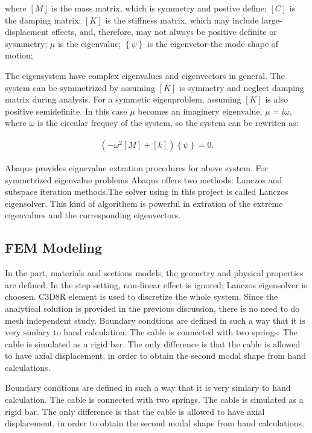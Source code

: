 \documentclass[paper=a4, fontsize=11pt]{scrartcl} %
\numberwithin{equation}{section} %
\numberwithin{figure}{section} %
\numberwithin{table}{section} %
\begin{document}
where $[M]$ is the mass matrix, which is symmetry and postive define;
$[C]$ is the damping matrix; $[K]$ is the stiffness matrix, which may
include large-displacment effects, and, therefore, may not always be
positive definite or sysmmetry; $\mu$ is the eigenvalue;
$\left\{\psi\right\}$ is the eigenvetor-the mode shape of motion;

The eigensystem have complex eigenvalues and eigenvectors in general.
The system can be symmetrized by assuming $[K]$ is symmetry and neglect
damping matrix during analysis. For a symmetic eigenproblem, assuming
$[K]$ is also positive semidefinite. In this case $\mu$ becomes an
imaginery eigenvalue, $\mu=i\omega$, where $\omega$ is the circular
frequey of the system, so the system can be rewriten as:

\begin{align}
\left(-\omega^2\left[M\right]+\left[k\right]\right)\left\{\psi\right\}=0.
\end{align}

Abaqus provides eignevalue extration procedures for above system. For
symmetrized eigenvalue problems Abaqus offers two methods: Lanczos and
subspace iteration methods.The solver using in this project is called
Lanczos eigensolver. This kind of algorithem is powerful in extration
of the extreme eigenvalues and the corresponding eigenvectors.

\subsection{FEM Modeling}
\label{sec:fem-modeling}

In the part, materials and sections models, the geometry and physical
properties are defined. In the step setting, non-linear effect is
ignored; Lanczos eigensolver is choosen. C3D8R element is used to
discretize the whole system. Since the analytical solution is provided
in the previous discussion, there is no need to do mesh independent
study. Boundary condtions are defined in such a way that it is very
simlary to hand calculation. The cable is connected with two springs.
The cable is simulated as a rigid bar. The only difference is that the
cable is allowed to have axial displacement, in order to obtain the
second modal shape from hand calculations.

Boundary condtions are defined in such a way that it is very simlary
to hand calculation. The cable is connected with two springs. The
cable is simulated as a rigid bar. The only difference is that the
cable is allowed to have axial displacement, in order to obtain the
second modal shape from hand calculations.
\end{document}
